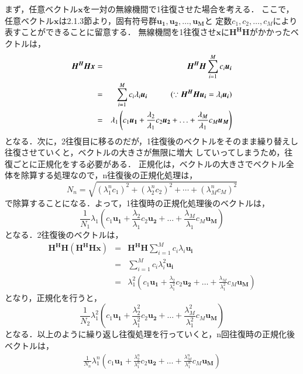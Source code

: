 まず，任意ベクトル$\bm{x}$を一対の無線機間で1往復させた場合を考える．
ここで，任意ベクトル$\bm{x}$は2.1.3節より，固有符号群$\bm{u_1},\bm{u_2},\ldots,\bm{u_M}$と
定数$c_1,c_2,\ldots,c_M$により表すことができることに留意する．
無線機間を1往復させ$\bm{x}$に$\bm{H^HH}$がかかったベクトルは，
\begin{eqnarray}
    \bm{H^HHx} &=& \bm{H^HH}\sum_{i=1}^M c_i\bm{u_i} \nonumber \\
    &=& \sum_{i=1}^M c_i\lambda_i\bm{u_i} \hspace{10mm} (\because \bm{H^HHu_i}=\lambda_i\bm{u_i}) \nonumber \\
    &=& \lambda_1\left(
        c_1\bm{u_1}+\frac{\lambda_2}{\lambda_1}c_2\bm{u_2}+\ldots+\frac{\lambda_M}{\lambda_1}c_M\bm{u_M}
    \right)
\end{eqnarray}
となる．次に，2往復目に移るのだが，1往復後のベクトルをそのまま繰り替えし往復させていくと，ベクトルの大きさが無限に増大
していってしまうため，往復ごとに正規化をする必要がある．
正規化は，ベクトルの大きさでベクトル全体を除算する処理なので，n往復後の正規化処理は，
\begin{equation}
    N_n = \sqrt{(\lambda_1^nc_1)^2+(\lambda_2^nc_2)^2+\cdots+(\lambda_M^nc_M)^2}
\end{equation}
で除算することになる．よって，1往復時の正規化処理後のベクトルは，
\begin{equation}
    \frac{1}{N_1}\lambda_1\left(
        c_1\bm{u_1}+\frac{\lambda_2}{\lambda_1}c_2\bm{u_2}+\ldots+\frac{\lambda_M}{\lambda_1}c_M\bm{u_M}
    \right)
\end{equation}
となる．2往復後のベクトルは，
\begin{eqnarray}
    \bm{H^HH(H^HHx)} &=& \bm{H^HH}\sum_{i=1}^M c_i\lambda_i\bm{u_i} \nonumber \\
    &=& \sum_{i=1}^M c_i\lambda_i^2\bm{u_i} \nonumber \\
    &=& \lambda_1^2\left(
        c_1\bm{u_1}+\frac{\lambda_2}{\lambda_1^2}c_2\bm{u_2}+\ldots+\frac{\lambda_M}{\lambda_1^2}c_M\bm{u_M}
    \right)
\end{eqnarray}
となり，正規化を行うと，
\begin{equation}
    \frac{1}{N_2}\lambda_1^2\left(
        c_1\bm{u_1}+\frac{\lambda_2^2}{\lambda_1^2}c_2\bm{u_2}+\ldots+\frac{\lambda_M^2}{\lambda_1^2}c_M\bm{u_M}
    \right)
\end{equation}
となる．以上のように繰り返し往復処理を行っていくと，n回往復時の正規化後ベクトルは，
\begin{eqnarray}
    \frac{1}{N_n}\lambda_1^n\left(
        c_1\bm{u_1}+\frac{\lambda_2^n}{\lambda_1^n}c_2\bm{u_2}+\ldots+\frac{\lambda_M^n}{\lambda_1^n}c_M\bm{u_M}
    \right)
\end{eqnarray}
